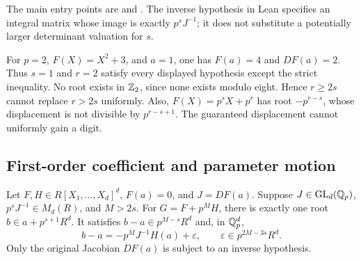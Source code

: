 The main entry points are
 and
.
The inverse hypothesis in Lean specifies an integral matrix whose image
is exactly $p^sJ^{-1}$; it does not substitute a potentially larger
determinant valuation for $s$.

\begin{example}
\label{ex:weighted-boundary}
For $p=2$, $F(X)=X^2+3$, and $a=1$, one has $F(a)=4$ and $DF(a)=2$.
Thus $s=1$ and $r=2$ satisfy every displayed hypothesis except the strict
inequality. No root exists in $\mathbb Z_2$, since none exists modulo eight.
Hence $r\ge2s$ cannot replace $r>2s$ uniformly. Also,
$F(X)=p^sX+p^r$ has root $-p^{r-s}$, whose displacement is not divisible
by $p^{r-s+1}$. The guaranteed displacement cannot uniformly gain a digit.
\end{example}

\subsection{First-order coefficient and parameter motion}

\begin{theorem}\label{thm:coefficient-motion}
Let $F,H\in R[X_1,\ldots,X_d]^d$, $F(a)=0$, and $J=DF(a)$. Suppose
$J\in\operatorname{GL}_d(\mathbb Q_p)$, $p^sJ^{-1}\in M_d(R)$, and $M>2s$.
For $G=F+p^MH$, there is exactly one root $b\in a+p^{s+1}R^d$.
It satisfies $b-a\in p^{M-s}R^d$ and, in $\mathbb Q_p^d$,
\begin{equation}\label{eq:coefficient-first-order}
 b-a=-p^MJ^{-1}H(a)+\varepsilon,
 \qquad\varepsilon\in p^{2M-3s}R^d.
\end{equation}
Only the original Jacobian $DF(a)$ is subject to an inverse hypothesis.
\end{theorem}

